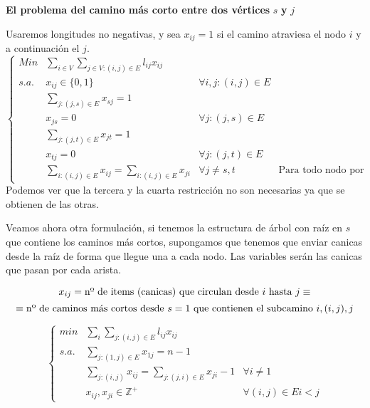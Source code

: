 \documentclass[openany]{book}
\begin{document}
\begin{exercise}
    {\color{turquoise} \textbf{El problema del camino más corto entre dos vértices} $ s $ \textbf{ y } $ j $}

    Usaremos longitudes no negativas, y sea $ x_{ij} = 1  $ si el camino atraviesa el nodo $ i $ y a continuación el $ j $.
    $$ \left\{
    \begin{array}{llrr}
        Min & \sum\limits_{i \in V}^{}\sum\limits_{j \in V: (i,j) \in E}^{} l_{ij}x_{ij}\\
        s.a. & x_{ij} \in \{0,1\} & \forall i,j: (i,j) \in E\\
        & \sum\limits_{j:(j,s) \in E}^{}x_{sj} = 1 \\
        & x_{js} = 0 & \forall j : (j,s) \in E\\
        & \sum\limits_{j:(j,t) \in E}^{} x_{jt} = 1\\
        & x_{tj} = 0 & \forall j : (j,t) \in E\\
        & \sum\limits_{i:(i,j) \in E}^{} x_{ij} = \sum\limits_{i:(i,j) \in E}^{} x_{ji} & \forall j \ne s,t & \text{Para todo nodo por el que entres, sales}
    \end{array}
    \right. $$
    Podemos ver que la tercera y la cuarta restricción no son necesarias ya que se obtienen de las otras.

    Veamos ahora otra formulación, si tenemos la estructura de árbol con raíz en $ s $ que contiene los caminos más cortos, supongamos que tenemos que enviar canicas desde la raíz de forma que llegue una a cada nodo. Las variables serán las canicas que pasan por cada arista.

    $$ x_{ij} = \text{nº de items (canicas) que circulan desde $ i $ hasta $ j $} \equiv $$$$ \equiv\text{nº de caminos más cortos desde $ s = 1 $ que contienen el subcamino $ i,(i,j),j $}$$


    $$ \left\{
    \begin{array}{llr}
        min & \sum\limits_{i}^{} \sum\limits_{j:(i,j)\in E}^{} l_{ij}x_{ij}\\
        s.a. & \sum\limits_{j:(1,j) \in E}^{} x_{1j} = n-1 \\
        & \sum\limits_{j: (i,j)}^{} x_{ij} = \sum\limits_{j:(j,i) \in E}^{} x_{ji}-1 & \forall i \ne 1\\
        & x_{ij},x_{ji} \in \mathbb{Z} ^{+} & \forall (i,j) \in E i<j
    \end{array}
    \right. $$
\end{exercise}
\end{document}
